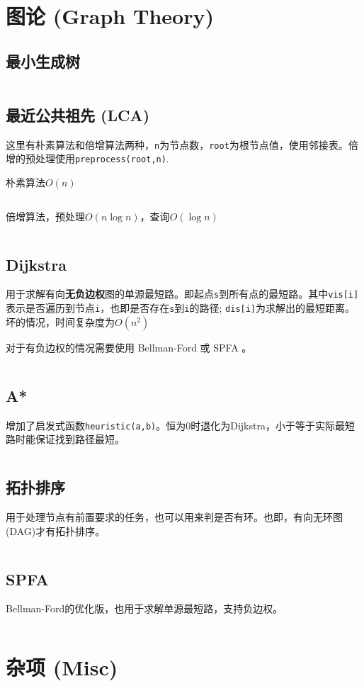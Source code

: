 \documentclass[openany,a4paper]{book}
\begin{document}
\chapter{图论 (Graph Theory)}
\section{最小生成树}
\inputminted{cpp}{Algorithm/mst.h}

\section{最近公共祖先 (LCA)}
这里有朴素算法和倍增算法两种，\verb|n|为节点数，\verb|root|为根节点值，使用邻接表。倍增的预处理使用\verb|preprocess(root,n)|.
\par 朴素算法$O(n)$
\inputminted{cpp}{GraphTheory/LCA-1.h}
倍增算法，预处理$O(n\log n)$，查询$O(\log n)$
\inputminted{cpp}{GraphTheory/LCA-2.hpp}


\section{Dijkstra}
用于求解有向\textbf{无负边权}图的单源最短路。即起点\verb|s|到所有点的最短路。其中\verb|vis[i]|表示是否遍历到节点\verb|i|，也即是否存在\verb|s|到\verb|i|的路径; \verb|dis[i]|为求解出的最短距离。坏的情况，时间复杂度为$O(n^2)$
\par 对于有负边权的情况需要使用 Bellman-Ford 或 SPFA 。
\inputminted{cpp}{GraphTheory/Dijkstra.h}

\section{A*}
增加了启发式函数\verb|heuristic(a,b)|。恒为0时退化为Dijkstra，小于等于实际最短路时能保证找到路径最短。
\inputminted{cpp}{GraphTheory/Astar.h}

\section{拓扑排序}
用于处理节点有前置要求的任务，也可以用来判是否有环。也即，有向无环图(DAG)才有拓扑排序。
\inputminted{cpp}{GraphTheory/TopoSort.h}

\section{SPFA}
Bellman-Ford的优化版，也用于求解单源最短路，支持负边权。
\inputminted{cpp}{GraphTheory/SPFA.h}

\chapter{杂项 (Misc)}
\end{document}
